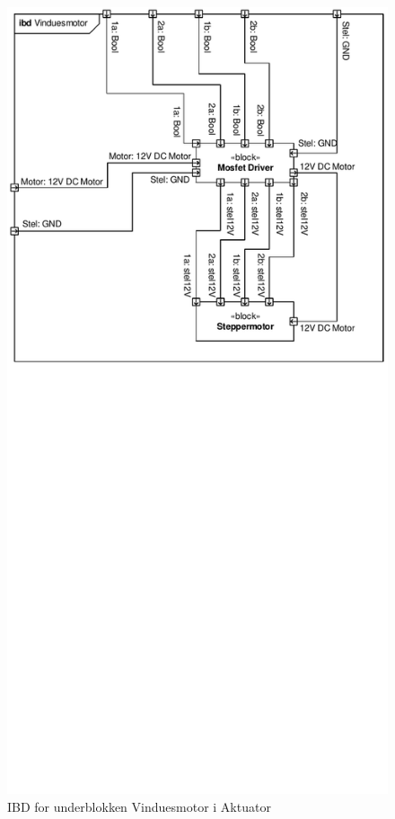 \begin{figure}[h]
\centering 
\includegraphics[width={\textwidth}, trim=0 390 0 0, clip=true] {../fig/ibd_vinduesmotor.pdf}
\caption{IBD for underblokken Vinduesmotor i Aktuator}
\label{fig:ibd_vinduesmotor}
\end{figure}

